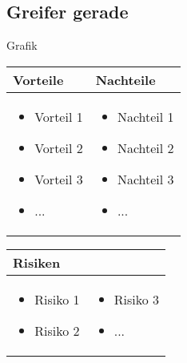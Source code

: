 \pagebreak


\subsection{Greifer gerade}
Grafik

\begin{table}[h]
\begin{tabular}{p{} | p{}}


 \textbf{Vorteile} & \textbf{Nachteile} \\ \hline
	 
\begin{itemize}
\item Vorteil 1
\item Vorteil 2
\item Vorteil 3
\item ...
\end{itemize}

 
 &
 
\begin{itemize}
\item Nachteil 1
\item Nachteil 2
\item Nachteil 3
\item ...
\end{itemize}

\end{tabular}
\end{table}

\begin{table}[h]
\begin{tabular}{p{}p{}}


 \textbf{Risiken} & \\ \hline
	 
\begin{itemize}
\item Risiko 1
\item Risiko 2
\end{itemize}
&
\begin{itemize}
\item Risiko 3
\item ...
\end{itemize}

 
\end{tabular}
\end{table}

\pagebreak